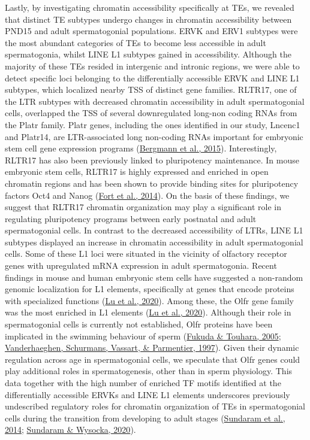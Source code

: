 \documentclass[12pt,twoside]{reedthesis}
\begin{document}
Lastly, by investigating chromatin accessibility specifically at TEs, we
revealed that distinct TE subtypes undergo changes in chromatin
accessibility between PND15 and adult spermatogonial populations. ERVK
and ERV1 subtypes were the most abundant categories of TEs to become
less accessible in adult spermatogonia, whilst LINE L1 subtypes gained
in accessibility. Although the majority of these TEs resided in
intergenic and intronic regions, we were able to detect specific loci
belonging to the differentially accessible ERVK and LINE L1 subtypes,
which localized nearby TSS of distinct gene families. RLTR17, one of the
LTR subtypes with decreased chromatin accessibility in adult
spermatogonial cells, overlapped the TSS of several downregulated
long-non coding RNAs from the Platr family. Platr genes, including the
ones identified in our study, Lncenc1 and Platr14, are LTR-associated
long non-coding RNAs important for embryonic stem cell gene expression
programs (\protect\hyperlink{ref-bergmann2015}{Bergmann et al., 2015}). Interestingly, RLTR17 has also been previously
linked to pluripotency maintenance. In mouse embryonic stem cells,
RLTR17 is highly expressed and enriched in open chromatin regions and
has been shown to provide binding sites for pluripotency factors Oct4
and Nanog (\protect\hyperlink{ref-fort2014}{Fort et al., 2014}). On the basis of these findings, we suggest that
RLTR17 chromatin organization may play a significant role in regulating
pluripotency programs between early postnatal and adult spermatogonial
cells. In contrast to the decreased accessibility of LTRs, LINE L1
subtypes displayed an increase in chromatin accessibility in adult
spermatogonial cells. Some of these L1 loci were situated in the
vicinity of olfactory receptor genes with upregulated mRNA expression in
adult spermatogonia. Recent findings in mouse and human embryonic stem
cells have suggested a non-random genomic localization for L1 elements,
specifically at genes that encode proteins with specialized functions
(\protect\hyperlink{ref-lu2020}{Lu et al., 2020}). Among these, the Olfr gene family was the most enriched in L1
elements (\protect\hyperlink{ref-lu2020}{Lu et al., 2020}). Although their role in spermatogonial cells is
currently not established, Olfr proteins have been implicated in the
swimming behaviour of sperm (\protect\hyperlink{ref-fukuda2005}{Fukuda \& Touhara, 2005}; \protect\hyperlink{ref-vanderhaeghen1997}{Vanderhaeghen, Schurmans, Vassart, \& Parmentier, 1997}). Given
their dynamic regulation across age in spermatogonial cells, we
speculate that Olfr genes could play additional roles in
spermatogenesis, other than in sperm physiology. This data together with
the high number of enriched TF motifs identified at the differentially
accessible ERVKs and LINE L1 elements underscores previously undescribed
regulatory roles for chromatin organization of TEs in spermatogonial
cells during the transition from developing to adult stages
(\protect\hyperlink{ref-sundaram2014}{Sundaram et al., 2014}; \protect\hyperlink{ref-sundaram2020}{Sundaram \& Wysocka, 2020}).
\end{document}
